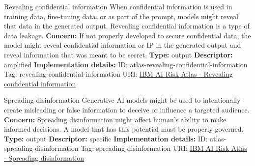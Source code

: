 \documentclass[a4paper,12pt]{article}
\begin{document}
\begin{definitionbox}{Revealing confidential information}
When confidential information is used in training data, fine-tuning data, or as part of the prompt, models might reveal that data in the generated output. Revealing confidential information is a type of data leakage.\newline\newline
\textbf{Concern: }If not properly developed to secure confidential data, the model might reveal confidential information or IP in the generated output and reveal information that was meant to be secret.\newline\newline
\textbf{Type: }output\newline
\textbf{Descriptor: }amplified \newline\newline
\textbf{Implementation details: } \newline
ID: atlas-revealing-confidential-information \newline
Tag: revealing-confidential-information \newline
URI:  \href{https://www.ibm.com/docs/en/watsonx/saas?topic=SSYOK8/wsj/ai-risk-atlas/revealing-confidential-information.html}{IBM AI Risk Atlas - Revealing confidential information}\newline
\end{definitionbox}
\begin{definitionbox}{Spreading disinformation}
Generative AI models might be used to intentionally create misleading or false information to deceive or influence a targeted audience.\newline\newline
\textbf{Concern: }Spreading disinformation might affect human's ability to make informed decisions. A model that has this potential must be properly governed.\newline\newline
\textbf{Type: }output\newline
\textbf{Descriptor: }specific \newline\newline
\textbf{Implementation details: } \newline
ID: atlas-spreading-disinformation \newline
Tag: spreading-disinformation \newline
URI:  \href{https://www.ibm.com/docs/en/watsonx/saas?topic=SSYOK8/wsj/ai-risk-atlas/spreading-disinformation.html}{IBM AI Risk Atlas - Spreading disinformation}\newline
\end{definitionbox}
\end{document}
